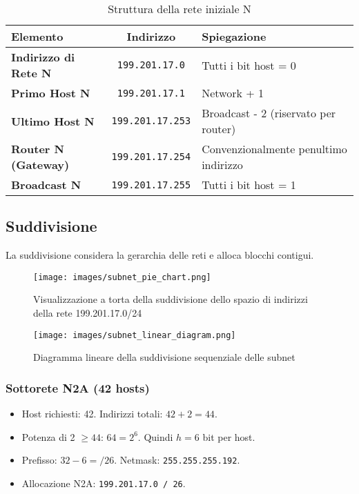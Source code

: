 \begin{table}[h]
\centering
\begin{tabular}{|l|c|l|}
\hline
\rowcolor{bg_custom}
\textcolor{primarytext}{\textbf{Elemento}} & \textcolor{primarytext}{\textbf{Indirizzo}} & \textcolor{primarytext}{\textbf{Spiegazione}} \\
\hline
\textbf{Indirizzo di Rete N} & \texttt{199.201.17.0} & Tutti i bit host = 0 \\
\hline
\textbf{Primo Host N} & \texttt{199.201.17.1} & Network + 1 \\
\hline
\textbf{Ultimo Host N} & \texttt{199.201.17.253} & Broadcast - 2 (riservato per router) \\
\hline
\textbf{Router N (Gateway)} & \texttt{199.201.17.254} & Convenzionalmente penultimo indirizzo \\
\hline
\textbf{Broadcast N} & \texttt{199.201.17.255} & Tutti i bit host = 1 \\
\hline
\end{tabular}
\caption{Struttura della rete iniziale N}
\end{table}

\subsection{Suddivisione}
La suddivisione considera la gerarchia delle reti e alloca blocchi contigui.

\begin{figure}[H]
    \centering
    \texttt{[image: images/subnet\_pie\_chart.png]}
    \caption{Visualizzazione a torta della suddivisione dello spazio di indirizzi della rete 199.201.17.0/24}
    \label{fig:subnet_pie}
\end{figure}
    
\begin{figure}[H]
    \centering
    \texttt{[image: images/subnet\_linear\_diagram.png]}
    \caption{Diagramma lineare della suddivisione sequenziale delle subnet}
    \label{fig:subnet_linear}
\end{figure}
        

\subsubsection{Sottorete N2A (42 hosts)}
\begin{itemize}
    \item Host richiesti: 42. Indirizzi totali: $42 + 2 = 44$.
    \item Potenza di 2 $\geq 44$: $64 = 2^6$. Quindi $h=6$ bit per host.
    \item Prefisso: $32 - 6 = /26$. Netmask: \texttt{255.255.255.192}.
    \item Allocazione N2A: \texttt{199.201.17.0 / 26}.
\end{itemize}

